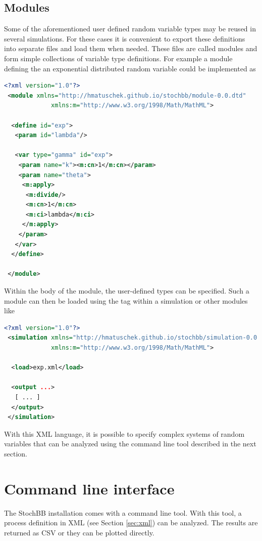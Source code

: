 \documentclass[a4paper, 10pt]{paper}
\begin{document}
\subsection{Modules}
Some of the aforementioned user defined random variable types may be reused in several
simulations. For these cases it is convenient to export these definitions into separate files
and load them when needed. These files are called modules and form simple collections of
variable type definitions. For example a module defining the an exponential distributed 
random variable could be implemented as
\begin{lstlisting}[language=XML]
 <?xml version="1.0"?>
 <module xmlns="http://hmatuschek.github.io/stochbb/module-0.0.dtd"
             xmlns:m="http://www.w3.org/1998/Math/MathML">

  <define id="exp">
   <param id="lambda"/>

   <var type="gamma" id="exp">
    <param name="k"><m:cn>1</m:cn></param>
    <param name="theta">
     <m:apply>
      <m:divide/>
      <m:cn>1</m:cn>
      <m:ci>lambda</m:ci>
     </m:apply>
    </param>
   </var>
  </define>

 </module>
\end{lstlisting}

Within the body of the module, the user-defined types can be specified. Such a module can then
be loaded using the  tag within a simulation or other modules like
\begin{lstlisting}[language=XML]
 <?xml version="1.0"?>
 <simulation xmlns="http://hmatuschek.github.io/stochbb/simulation-0.0.dtd"
             xmlns:m="http://www.w3.org/1998/Math/MathML">

  <load>exp.xml</load>

  <output ...>
   [ ... ]
  </output>
 </simulation>
\end{lstlisting}

With this XML language, it is possible to specify complex systems of random variables that can be analyzed 
using the  command line tool described in the next section.

\section{Command line interface} \label{sec:cli}
The StochBB installation comes with a command line tool. With this tool, a process definition
in XML (see Section \ref{sec:xml}) can be analyzed. The results are returned as CSV or they can be plotted
directly.
\end{document}
